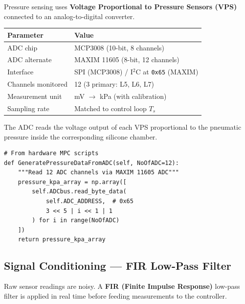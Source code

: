 \documentclass[11pt,a4paper]{article}
\begin{document}
\begin{hardwarebox}
Pressure sensing uses \textbf{Voltage Proportional to Pressure Sensors (VPS)}
connected to an analog-to-digital converter.

\begin{center}
\begin{tabular}{ll}
\toprule
\textbf{Parameter} & \textbf{Value} \\
\midrule
ADC chip & MCP3008 (10-bit, 8 channels) \\
ADC alternate & MAXIM 11605 (8-bit, 12 channels) \\
Interface & SPI (MCP3008) / I$^2$C at \texttt{0x65} (MAXIM) \\
Channels monitored & 12 (3 primary: L5, L6, L7) \\
Measurement unit & mV $\to$ kPa (with calibration) \\
Sampling rate & Matched to control loop $T_s$ \\
\bottomrule
\end{tabular}
\end{center}

The ADC reads the voltage output of each VPS proportional to the pneumatic
pressure inside the corresponding silicone chamber.
\end{hardwarebox}

\begin{codebox}
\begin{lstlisting}
# From hardware MPC scripts
def GeneratePressureDataFromADC(self, NoOfADC=12):
    """Read 12 ADC channels via MAXIM 11605 ADC"""
    pressure_kpa_array = np.array([
        self.ADCbus.read_byte_data(
            self.ADC_ADDRESS,  # 0x65
            3 << 5 | i << 1 | 1
        ) for i in range(NoOfADC)
    ])
    return pressure_kpa_array
\end{lstlisting}
\end{codebox}

\subsection{Signal Conditioning --- FIR Low-Pass Filter}
\label{sec:filter}

Raw sensor readings are noisy. A \textbf{FIR (Finite Impulse Response)} low-pass
filter is applied in real time before feeding measurements to the controller.
\end{document}
